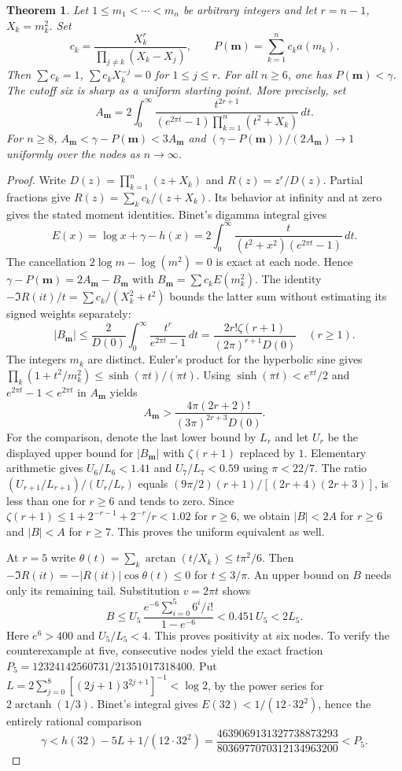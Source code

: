 \documentclass[11pt,a4paper,oneside,openany]{report}
\newtheorem{theorem}{Theorem}[section]
\theoremstyle{remark}\newtheorem{remark}[theorem]{Remark}
\numberwithin{equation}{section}
\begin{document}
\begin{theorem}\label{ch3:sq:arbitrary}
Let $1\le m_1<\cdots<m_n$ be arbitrary integers and let $r=n-1$, $X_k=m_k^2$. Set
\[
 c_k=\frac{X_k^r}{\prod_{j\ne k}(X_k-X_j)},\qquad
 P(\mathbf m)=\sum_{k=1}^n c_k a(m_k).
\]
Then $\sum c_k=1$, $\sum c_k X_k^{-j}=0$ for $1\le j\le r$.
For all $n\ge6$, one has $P(\mathbf m)<\gamma$. The cutoff six is sharp as a uniform starting point. More precisely, set
\[
 A_{\mathbf m}=2\int_0^\infty
      \frac{t^{2r+1}}{(e^{2\pi t}-1)\prod_{k=1}^n(t^2+X_k)}\,dt .
\]
For $n\ge8$, $A_{\mathbf m}<\gamma-P(\mathbf m)<3A_{\mathbf m}$ and
$(\gamma-P(\mathbf m))/(2A_{\mathbf m})\to1$ uniformly over the nodes as $n\to\infty$.
\end{theorem}
\begin{proof}
Write $D(z)=\prod_{k=1}^n(z+X_k)$ and $R(z)=z^r/D(z)$. Partial fractions give $R(z)=\sum_k c_k/(z+X_k)$. Its behavior at infinity and at zero gives the stated moment identities. Binet's digamma integral \cite{dlmf} gives
\[
 E(x)=\log x+\gamma-h(x)=2\int_0^\infty
 \frac{t}{(t^2+x^2)(e^{2\pi t}-1)}\,dt .
\]
The cancellation $2\log m-\log(m^2)=0$ is exact at each node. Hence
$\gamma-P(\mathbf m)=2A_{\mathbf m}-B_{\mathbf m}$ with
$B_{\mathbf m}=\sum c_k E(m_k^2)$. The identity
$-\Im R(it)/t=\sum c_k/(X_k^2+t^2)$ bounds the latter sum without estimating its signed weights separately:
\[
 |B_{\mathbf m}|\le\frac{2}{D(0)}\int_0^\infty
             \frac{t^r}{e^{2\pi t}-1}\,dt
   =\frac{2r!\zeta(r+1)}{(2\pi)^{r+1}D(0)}\quad(r\ge1).
\]
The integers $m_k$ are distinct. Euler's product for the hyperbolic sine gives
$\prod_k(1+t^2/m_k^2)\le\sinh(\pi t)/(\pi t)$.
Using $\sinh(\pi t)<e^{\pi t}/2$ and $e^{2\pi t}-1<e^{2\pi t}$ in $A_{\mathbf m}$ yields
\[
 A_{\mathbf m}>
 \frac{4\pi(2r+2)!}{(3\pi)^{2r+3}D(0)} .
\]
For the comparison, denote the last lower bound by $L_r$ and let $U_r$ be the displayed upper bound for $|B_{\mathbf m}|$ with $\zeta(r+1)$ replaced by $1$. Elementary arithmetic gives $U_6/L_6<1.41$ and $U_7/L_7<0.59$ using $\pi<22/7$. The ratio $(U_{r+1}/L_{r+1})/(U_r/L_r)$ equals $(9\pi/2)(r+1)/[(2r+4)(2r+3)]$, is less than one for $r\ge6$ and tends to zero. Since $\zeta(r+1)\le 1+2^{-r-1}+2^{-r}/r<1.02$ for $r\ge6$, we obtain $|B|<2A$ for $r\ge6$ and $|B|<A$ for $r\ge7$. This proves the uniform equivalent as well.

At $r=5$ write $\theta(t)=\sum_k\arctan(t/X_k)\le t\pi^2/6$. Then $-\Im R(it)=-|R(it)|\cos\theta(t)\le0$ for $t\le3/\pi$. An upper bound on $B$ needs only its remaining tail. Substitution $v=2\pi t$ shows
\[
 B\le U_5\,\frac{e^{-6}\sum_{i=0}^5 6^i/i!}{1-e^{-6}}
 <0.451\,U_5 <2L_5.
\]
Here $e^6>400$ and $U_5/L_5<4$. This proves positivity at six nodes. To verify the counterexample at five, consecutive nodes yield the exact fraction
$P_5=12324142560731/21351017318400$. Put $L=2\sum_{j=0}^{8}[(2j+1)3^{2j+1}]^{-1}<\log2$, by the power series for $2\operatorname{arctanh}(1/3)$. Binet's integral gives $E(32)<1/(12\cdot 32^2)$, hence the entirely rational comparison
\[
 \gamma<h(32)-5L+1/(12\cdot32^2)
 =\frac{4639069131327738873293}{8036977070312134963200}<P_5 .
\]
\end{proof}
\end{document}
